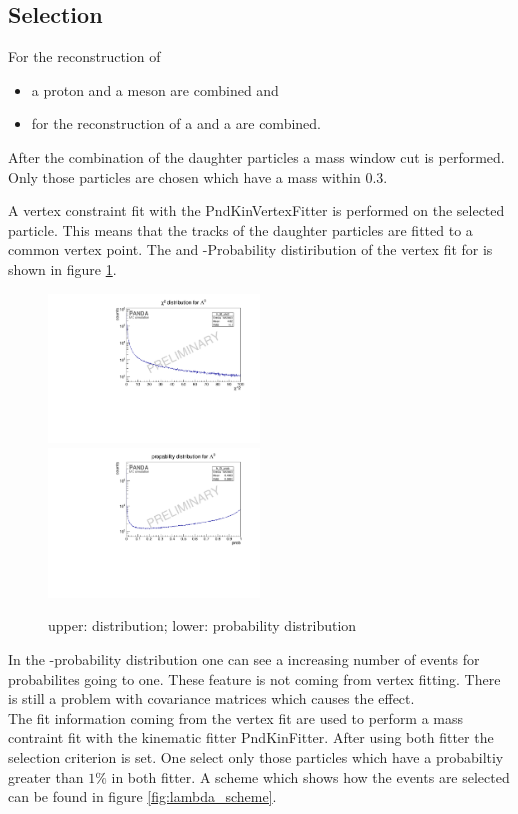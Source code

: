 	\subsection*{Selection}
		For the reconstruction of 
		
		\begin{itemize}
			\item \lam a proton and a \piminus meson are combined and
			\item for the reconstruction of \alam a \antiproton and a \piplus are combined.
		\end{itemize}
		 
		After the combination of the daughter particles a mass window cut is performed.
		Only those particles are chosen which have a mass within $0.3$\massunit.
		
		
		A vertex constraint fit with the PndKinVertexFitter is performed on the selected particle.
		This means that the tracks of the daughter particles are fitted to a common vertex point.  
		The \chisq and \chisq-Probability distiribution of the vertex fit for \lam is shown in figure \ref{fig:lambda_chi2}.
		
		\begin{figure}
			\centering
				\includegraphics[width=0.50\textwidth]{./plots/lambda0/lambda0_chisqrt.pdf}
				\includegraphics [width=0.50\textwidth]{./plots/lambda0/lambda0_prob.pdf}
			\caption{upper: \chisq distribution; lower: \chisq probability distribution}
			\label{fig:lambda_chi2}
		\end{figure}
		
		In the \chisq-probability distribution one can see a increasing number of events for probabilites going to one.
		These feature is not coming from vertex fitting.
		There is still a problem with covariance matrices which causes the effect.
		\vspace{11pt}\\
		The fit information coming from the vertex fit are used to perform a mass contraint fit with the kinematic fitter PndKinFitter.
		After using both fitter the selection criterion is set. 
		One select only those particles which have a probabiltiy greater than $1\%$ in both fitter.
		A scheme which shows how the events are selected can be found in figure \ref{fig:lambda_scheme}. 
		
